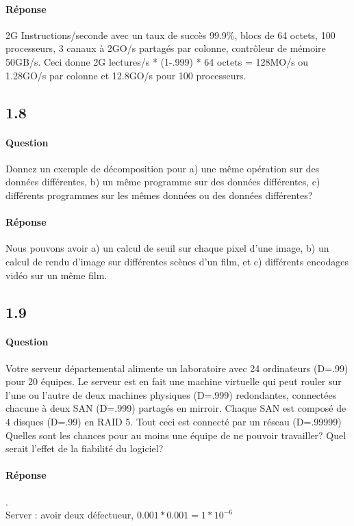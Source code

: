 \documentclass[oneside]{book}
\begin{document}
\paragraph{Réponse}
2G Instructions/seconde avec un taux de succès 99.9\%, blocs de 64 octets, 100
processeurs, 3 canaux à 2GO/s partagés par colonne, contrôleur de mémoire
50GB/s. Ceci donne 2G lectures/s * (1-.999) * 64 octets = 128MO/s ou 1.28GO/s
par colonne et 12.8GO/s pour 100 processeurs.
\subsection{1.8}
\paragraph{Question}
Donnez un exemple de décomposition pour a) une même opération sur des
données différentes, b) un même programme sur des données différentes, c)
différents programmes sur les mêmes données ou des données différentes?
\paragraph{Réponse}
Nous pouvons avoir a) un calcul de seuil sur chaque pixel d'une image, b) un
calcul de rendu d'image sur différentes scènes d'un film, et c) différents
encodages vidéo sur un même film.
\subsection{1.9}
\paragraph{Question}
Votre serveur départemental alimente un laboratoire avec 24 ordinateurs (D=.99)
pour 20 équipes. Le serveur est en fait une machine virtuelle qui peut rouler sur
l'une ou l'autre de deux machines physiques (D=.999) redondantes, connectées
chacune à deux SAN (D=.999) partagés en mirroir. Chaque SAN est composé de
4 disques (D=.99) en RAID 5. Tout ceci est connecté par un réseau (D=.99999)
Quelles sont les chances pour au moins une équipe de ne pouvoir travailler? Quel
serait l'effet de la fiabilité du logiciel?
\paragraph{Réponse}.\\

Server : avoir deux défectueur, $0.001*0.001 = 1*10^{-6}$\\
\end{document}
